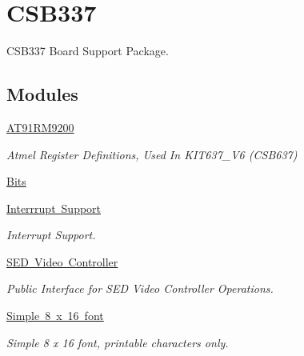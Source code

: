 \hypertarget{group__RTEMSBSPsARMCSB337}{}\section{C\+S\+B337}
\label{group__RTEMSBSPsARMCSB337}


C\+S\+B337 Board Support Package.  


\subsection*{Modules}
\begin{DoxyCompactItemize}
\item 
\mbox{\hyperlink{group__csb337__at91rm9200}{A\+T91\+R\+M9200}}
\begin{DoxyCompactList}\small\item\em Atmel Register Definitions, Used In K\+I\+T637\+\_\+\+V6 (C\+S\+B637) \end{DoxyCompactList}\item 
\mbox{\hyperlink{group__csb337__bits}{Bits}}
\item 
\mbox{\hyperlink{group__csb337__interrupt}{Interrrupt Support}}
\begin{DoxyCompactList}\small\item\em Interrupt Support. \end{DoxyCompactList}\item 
\mbox{\hyperlink{group__csb337__sed1356}{S\+E\+D Video Controller}}
\begin{DoxyCompactList}\small\item\em Public Interface for S\+ED Video Controller Operations. \end{DoxyCompactList}\item 
\mbox{\hyperlink{group__csb337__font}{Simple 8 x 16 font}}
\begin{DoxyCompactList}\small\item\em Simple 8 x 16 font, printable characters only. \end{DoxyCompactList}\end{DoxyCompactItemize}
